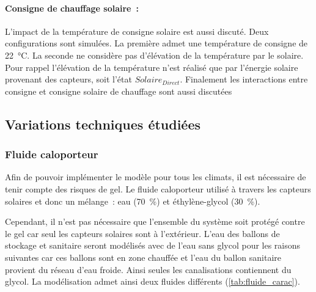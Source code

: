 \paragraph{Consigne de chauffage solaire~:} %
\label{par:consigne_de_chauffage_solaire}
L’impact de la température de consigne solaire est aussi discuté. Deux configurations sont
simulées. La première admet une température de consigne de \SI{22}{\celsius}. La
seconde ne considère pas d’élévation de la température par le solaire. Pour rappel
l’élévation de la température n’est réalisé que par l’énergie solaire provenant des
capteurs, soit l’état $Solaire_{Direct}$. Finalement les interactions entre consigne et
consigne solaire de chauffage sont aussi discutées


\subsection{Variations techniques étudiées} %
\label{sub:variations_techniques_etudiees}
\subsubsection{Fluide caloporteur} %
\label{ssub:fluide_caloporteur}
Afin de pouvoir implémenter le modèle pour tous les climats, il est nécessaire de
tenir compte des risques de gel. Le fluide caloporteur utilisé à travers les capteurs
solaires et donc un mélange~: eau (\SI{70}{\percent}) et éthylène-glycol (\SI{30}{\percent}).

Cependant, il n’est pas nécessaire que l’ensemble du système soit protégé contre
le gel car seul les capteurs solaires sont à l’extérieur. L’eau des ballons de stockage
et sanitaire seront modélisés avec de l’eau sans glycol pour les raisons suivantes car
ces ballons sont en zone chauffée et l’eau du ballon sanitaire provient du réseau
d’eau froide. Ainsi seules les canalisations contiennent du glycol.
La modélisation admet ainsi deux fluides différents (\autoref{tab:fluide_carac}).

